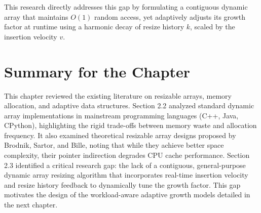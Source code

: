 This research directly addresses this gap by formulating a contiguous dynamic 
array that maintains $O(1)$ random access, yet adaptively adjusts its growth 
factor at runtime using a harmonic decay of resize history $k$, scaled by the 
insertion velocity $v$.

\section{Summary for the Chapter}
This chapter reviewed the existing literature on resizable arrays, memory 
allocation, and adaptive data structures. Section 2.2 analyzed standard dynamic 
array implementations in mainstream programming languages (C++, Java, CPython), 
highlighting the rigid trade-offs between memory waste and allocation frequency. 
It also examined theoretical resizable array designs proposed by Brodnik, Sartor, 
and Bille, noting that while they achieve better space complexity, their 
pointer indirection degrades CPU cache performance. Section 2.3 identified a 
critical research gap: the lack of a contiguous, general-purpose dynamic 
array resizing algorithm that incorporates real-time insertion velocity and 
resize history feedback to dynamically tune the growth factor. This gap 
motivates the design of the workload-aware adaptive growth models detailed in 
the next chapter.
